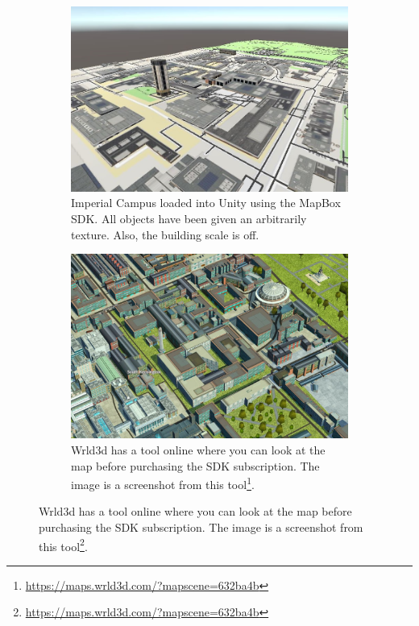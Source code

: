 \begin{figure}[!htbp] 
\centering
\begin{minipage}[t]{.45\textwidth}
\centering
\begin{subfigure}{\textwidth}
        \includegraphics[width=\linewidth, left]{06_Implementation/00_Maps/Images/MapBox1Cropped.JPG}
        \caption{Imperial Campus loaded into Unity using the MapBox SDK. All objects have been given an arbitrarily texture. Also, the building scale is off.}
        \label{maps:figure:MapBox}
    \end{subfigure}
\end{minipage}
\qquad
\begin{minipage}[t]{.45\textwidth}
    \centering
    \begin{subfigure}{\textwidth}
        \includegraphics[width=\linewidth, right]{06_Implementation/00_Maps/Images/Wrld3D1Cropped.JPG}
        \caption{Wrld3d has a tool online where you can look at the map before purchasing the SDK subscription. The image is a screenshot from this tool\footnote{\url{https://maps.wrld3d.com/?mapscene=632ba4b}}.}
        \label{maps:figure:Wrld3D}
    \end{subfigure}
\end{minipage}
\end{figure}

